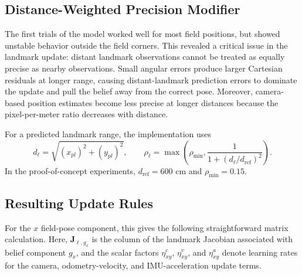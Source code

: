 \subsection{Distance-Weighted Precision Modifier}
\label{subsec:distance-weighted-precision}

The first trials of the model worked well for most field positions, but showed unstable behavior outside the field corners. This revealed a critical issue in the landmark update: distant landmark observations cannot be treated as equally precise as nearby observations. Small angular errors produce larger Cartesian residuals at longer range, causing distant-landmark prediction errors to dominate the update and pull the belief away from the correct pose. Moreover, camera-based position estimates become less precise at longer distances because the pixel-per-meter ratio decreases with distance. 

For a predicted landmark range, the implementation uses
\begin{equation}
    d_\ell =
    \sqrt{
        \left(x_{pl}\right)^2
        +
        \left(y_{pl}\right)^2
    },
    \qquad
    \rho_\ell
    =
    \max
    \left(
        \rho_{\min},
        \frac{1}{1 + \left(d_\ell / d_{\mathrm{ref}}\right)^2}
    \right).
    \label{eq:distance-precision-modifier}
\end{equation}
In the proof-of-concept experiments, $d_{\mathrm{ref}}=600$ cm and $\rho_{\min}=0.15$.

\subsection{Resulting Update Rules}
\label{subsec:update-rules}

For the $x$ field-pose component, this gives the following straightforward
matrix calculation. Here, $\boldsymbol{J}_{\ell,g_x}$ is the column of the
landmark Jacobian associated with belief component $g_x$, and the scalar factors
$\eta^{c}_{xy}$, $\eta^{v}_{xy}$, and $\eta^{a}_{xy}$ denote learning rates for
the camera, odometry-velocity, and IMU-acceleration update terms.

